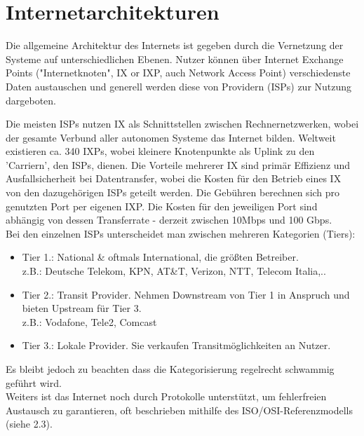 \documentclass[11pt]{article}
\begin{document}
    \section{Internetarchitekturen}
    Die allgemeine Architektur des Internets ist gegeben durch die Vernetzung der
    Systeme auf unterschiedlichen Ebenen.  Nutzer können über Internet Exchange Points
    ("Internetknoten", IX or IXP, auch Network Access Point) verschiedenste Daten
    austauschen und generell werden diese von Providern (ISPs) zur Nutzung dargeboten.

    Die meisten ISPs nutzen IX als Schnittstellen zwischen Rechnernetzwerken, wobei der
    gesamte Verbund aller autonomen Systeme das Internet bilden. Weltweit existieren ca.
    340 IXPs, wobei kleinere Knotenpunkte als Uplink zu den 'Carriern', den ISPs, dienen.
    Die Vorteile mehrerer IX sind primär Effizienz und Ausfallsicherheit bei Datentransfer, wobei
    die Kosten für den Betrieb eines IX von den dazugehörigen ISPs geteilt werden. Die Gebühren
    berechnen sich pro genutzten Port per eigenen IXP. Die Kosten für den jeweiligen Port sind
    abhängig von dessen Transferrate - derzeit zwischen 10Mbps und 100 Gbps.\\


    \noindent Bei den einzelnen ISPs unterscheidet man zwischen mehreren Kategorien (Tiers):
    \begin{itemize}
    \item Tier 1.: National \& oftmals International, die größten Betreiber. \\
    z.B.: Deutsche Telekom, KPN, AT\&T, Verizon, NTT, Telecom Italia,..
    \item Tier 2.: Transit Provider. Nehmen Downstream von Tier 1 in Anspruch und bieten Upstream für Tier 3.\\
    z.B.: Vodafone, Tele2, Comcast
    \item Tier 3.: Lokale Provider. Sie verkaufen Transitmöglichkeiten an Nutzer.
    \end{itemize}
    \noindent Es bleibt jedoch zu beachten dass die Kategorisierung regelrecht schwammig geführt wird.\\

    \noindent Weiters ist das Internet noch durch Protokolle unterstützt, um fehlerfreien Austausch
    zu garantieren, oft beschrieben mithilfe des ISO/OSI-Referenzmodells (siehe 2.3).
\end{document}
